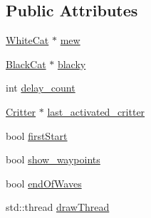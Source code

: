 \subsection*{Public Attributes}
\begin{DoxyCompactItemize}
\item 
\hyperlink{class_white_cat}{White\+Cat} $\ast$ \hyperlink{class_game_state_play_a90934640484bd6417007e112d8034a50}{mew}
\item 
\hyperlink{class_black_cat}{Black\+Cat} $\ast$ \hyperlink{class_game_state_play_ace195ef46750d243d3bbaf2abaaf6e2e}{blacky}
\item 
int \hyperlink{class_game_state_play_aa0948c192d3ef1adb6eaaeade8521733}{delay\+\_\+count}
\item 
\hyperlink{class_critter}{Critter} $\ast$ \hyperlink{class_game_state_play_ad6c5af538edc9f5b2fd3ba0c0f95e89d}{last\+\_\+activated\+\_\+critter}
\item 
bool \hyperlink{class_game_state_play_a59cc893637827eb0d9ee902262548980}{first\+Start}
\item 
bool \hyperlink{class_game_state_play_a406124f1525e8555fb264c743298d7b9}{show\+\_\+waypoints}
\item 
bool \hyperlink{class_game_state_play_a0e613be489b2c61857676303a15ce3cc}{end\+Of\+Waves}
\item 
std\+::thread \hyperlink{class_game_state_play_aac5b1d9de4ab0ad2445d97a588cb3168}{draw\+Thread}
\end{DoxyCompactItemize}
